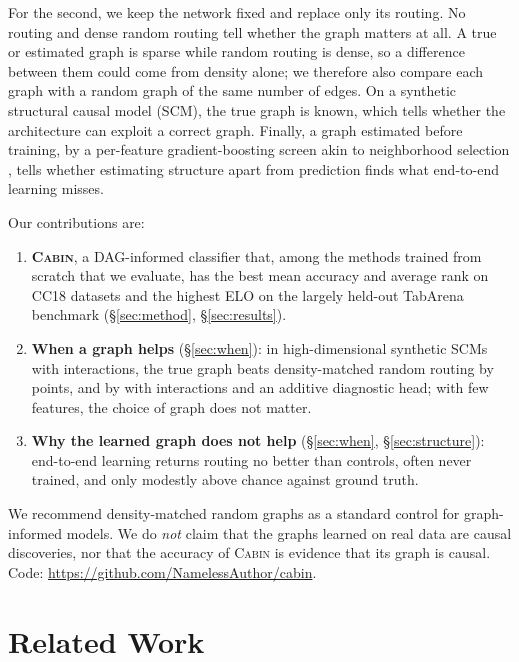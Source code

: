 \documentclass[anon,12pt]{clear2027} %
\newcommand{\Cabin}{\textsc{Cabin}}
\newcommand{\CodeURL}{\url{https://github.com/NamelessAuthor/cabin}}
\begin{document}
For the second, we keep the network fixed and replace only its routing. No routing and dense random routing tell whether the graph matters at all. A true or estimated graph is sparse while random routing is dense, so a difference between them could come from density alone; we therefore also compare each graph with a random graph of the same number of edges. On a synthetic structural causal model (SCM), the true graph is known, which tells whether the architecture can exploit a correct graph. Finally, a graph estimated before training, by a per-feature gradient-boosting screen akin to neighborhood selection \citep{meinshausen2006high}, tells whether estimating structure apart from prediction finds what end-to-end learning misses.

Our contributions are:
\begin{enumerate}
  \item \textbf{\Cabin{}}, a DAG-informed classifier that, among the methods trained from scratch that we evaluate, has the best mean accuracy and average rank on \NCCtasks{} CC18 datasets and the highest ELO on the largely held-out TabArena benchmark (\S\ref{sec:method}, \S\ref{sec:results}).
  \item \textbf{When a graph helps} (\S\ref{sec:when}): in high-dimensional synthetic SCMs with interactions, the true graph beats density-matched random routing by \SynHighTrueRandTrueAbs{} points, and by \SynHighAddTrueRandTrueLamOneAbs{} with interactions and an additive diagnostic head; with few features, the choice of graph does not matter.
  \item \textbf{Why the learned graph does not help} (\S\ref{sec:when}, \S\ref{sec:structure}): end-to-end learning returns routing no better than controls, often never trained, and only modestly above chance against ground truth.
\end{enumerate}
We recommend density-matched random graphs as a standard control for graph-informed models. We do \emph{not} claim that the graphs learned on real data are causal discoveries, nor that the accuracy of \Cabin{} is evidence that its graph is causal. Code: \CodeURL{}.

\section{Related Work}
\label{sec:related}
\end{document}
